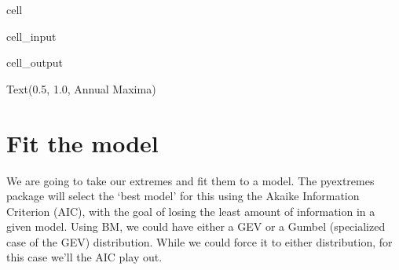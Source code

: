 \documentclass[letterpaper,10pt,english]{jupyterBook}
\begin{document}
\begin{sphinxuseclass}{cell}\begin{sphinxVerbatimInput}

\begin{sphinxuseclass}{cell_input}
\begin{sphinxVerbatim}[commandchars=\\\{\}]
   
\end{sphinxVerbatim}

\end{sphinxuseclass}\end{sphinxVerbatimInput}
\begin{sphinxVerbatimOutput}

\begin{sphinxuseclass}{cell_output}
\begin{sphinxVerbatim}[commandchars=\\\{\}]
Text(0.5, 1.0, \PYGZsq{}Annual Maxima\PYGZsq{})
\end{sphinxVerbatim}

\noindent{}

\end{sphinxuseclass}\end{sphinxVerbatimOutput}

\end{sphinxuseclass}

\chapter{Fit the model}
\label{\detokenize{notebooks/regional_and_local/SL_Extremes_annual:fit-the-model}}
\sphinxAtStartPar
We are going to take our extremes and fit them to a model. The pyextremes package will select the ‘best model’ for this using the Akaike Information Criterion (AIC), with the goal of losing the least amount of information in a given model. Using BM, we could have either a GEV or a Gumbel (specialized case of the GEV) distribution. While we could force it to either distribution, for this case we’ll the AIC play out.
\end{document}
